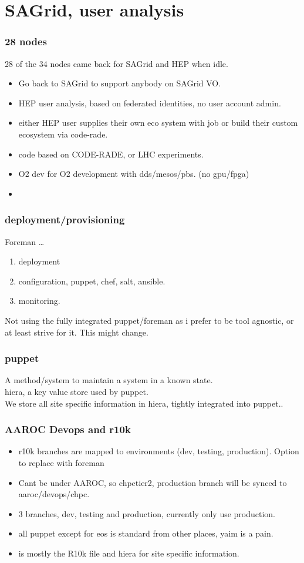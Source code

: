 \documentclass{beamer}
\begin{document}
\section{SAGrid, user analysis}
\begin{frame}
\frametitle{28 nodes}
28 of the 34 nodes came back for SAGrid and HEP when idle.
\begin{itemize}
  \item Go back to SAGrid to support anybody on SAGrid VO.
  \item HEP user analysis, based on federated identities, no user account admin.
  \item either HEP user supplies their own eco system with job or build their custom ecosystem via code-rade.
  \item code based on CODE-RADE, or LHC experiments.
  \item O2 dev for O2 development with dds/mesos/pbs. (no gpu/fpga)
  \item \color{red}{Local Storage for users, eos and lustre.}
\end{itemize}
\end{frame}

\begin{frame}
  \frametitle{deployment/provisioning}
  Foreman \ldots
  \begin{enumerate}
    \item deployment
    \item configuration, puppet, chef, salt, ansible.
    \item monitoring.
  \end{enumerate}
  Not using the fully integrated puppet/foreman as i prefer to be 
  tool agnostic, or at least strive for it. This might change.
\end{frame}


\begin{frame}
  \frametitle{puppet}
  A method/system to maintain a system in a known state.\\
  hiera, a key value store used by puppet.\\
  We store all site specific information in hiera, tightly integrated into puppet..
\end{frame}

\begin{frame}
\frametitle{AAROC Devops and r10k}
\begin{itemize}
  \item r10k branches are mapped to environments (dev, testing, production). Option to replace with foreman
  \item Cant be under AAROC, so chpctier2, production branch will be synced to aaroc/devops/chpc.
  \item 3 branches, dev, testing and production, currently only use production.
  \item all puppet except for eos is standard from other places, yaim is a pain.
      \item is mostly the R10k file and hiera for site specific information.
\end{itemize}
\end{frame}
\end{document}
